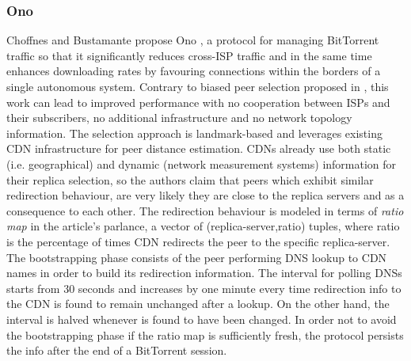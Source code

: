 \subsubsection{Ono}
Choffnes and Bustamante propose Ono \cite{cb_ono_2008}, a protocol for managing
BitTorrent traffic so that it significantly reduces cross-ISP traffic and in
the same time enhances downloading rates by favouring connections within the
borders of a single autonomous system. Contrary to biased peer selection
proposed in \cite{rpc_bitbiased_2006}, this work can lead to improved
performance with no cooperation between ISPs and their subscribers, no
additional infrastructure and no network topology information. The selection
approach is landmark-based and leverages existing CDN infrastructure for peer
distance estimation. CDNs already use both static (i.e. geographical) and
dynamic (network measurement systems) information for their replica selection,
so the authors claim that peers which exhibit similar redirection behaviour, are
very likely they are close to the replica servers and as a consequence to each
other. The redirection behaviour is modeled in terms of \emph{ratio map} in the
article's parlance, a vector of (replica-server,ratio) tuples, where ratio is
the percentage of times CDN redirects the peer to the specific replica-server.
The bootstrapping phase consists of the peer performing DNS lookup to CDN names
in order to build its redirection information. The interval for polling DNSs
starts from 30 seconds and increases by one minute every time redirection info
to the CDN is found to remain unchanged after a lookup. On the other hand, the
interval is halved whenever is found to have been changed. In order not to avoid
the bootstrapping phase if the ratio map is sufficiently fresh, the protocol
persists the info after the end of a BitTorrent session.

